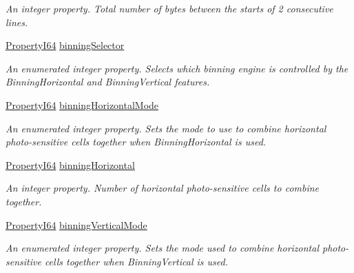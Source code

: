 \begin{DoxyCompactItemize}
\begin{DoxyCompactList}\small\item\em An integer property. Total number of bytes between the starts of 2 consecutive lines. \end{DoxyCompactList}\item 
\hyperlink{group___common_interface_ga81749b2696755513663492664a18a893}{Property\+I64} \hyperlink{classmv_i_m_p_a_c_t_1_1acquire_1_1_gen_i_cam_1_1_image_format_control_abc9a8da47925016f49531ccc884fcf8a}{binning\+Selector}
\begin{DoxyCompactList}\small\item\em An enumerated integer property. Selects which binning engine is controlled by the Binning\+Horizontal and Binning\+Vertical features. \end{DoxyCompactList}\item 
\hyperlink{group___common_interface_ga81749b2696755513663492664a18a893}{Property\+I64} \hyperlink{classmv_i_m_p_a_c_t_1_1acquire_1_1_gen_i_cam_1_1_image_format_control_aa5c3bf007ccc16a550ae487cddb9343e}{binning\+Horizontal\+Mode}
\begin{DoxyCompactList}\small\item\em An enumerated integer property. Sets the mode to use to combine horizontal photo-\/sensitive cells together when Binning\+Horizontal is used. \end{DoxyCompactList}\item 
\hyperlink{group___common_interface_ga81749b2696755513663492664a18a893}{Property\+I64} \hyperlink{classmv_i_m_p_a_c_t_1_1acquire_1_1_gen_i_cam_1_1_image_format_control_a907bd8d4f8c18b487718a5cfea0ed2e6}{binning\+Horizontal}
\begin{DoxyCompactList}\small\item\em An integer property. Number of horizontal photo-\/sensitive cells to combine together. \end{DoxyCompactList}\item 
\hyperlink{group___common_interface_ga81749b2696755513663492664a18a893}{Property\+I64} \hyperlink{classmv_i_m_p_a_c_t_1_1acquire_1_1_gen_i_cam_1_1_image_format_control_aa0da18196345e5cfa2a106b143afd777}{binning\+Vertical\+Mode}
\begin{DoxyCompactList}\small\item\em An enumerated integer property. Sets the mode used to combine horizontal photo-\/sensitive cells together when Binning\+Vertical is used. \end{DoxyCompactList}\item 

\end{DoxyCompactItemize}
